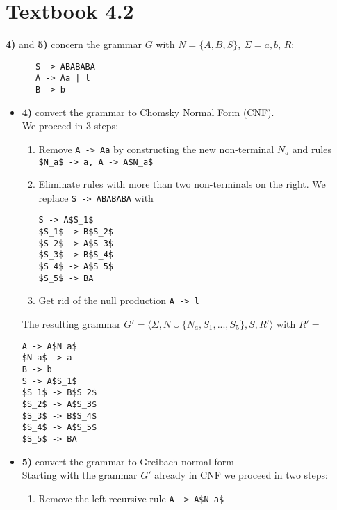 \documentclass[defaultpackages]{simplereport}
\begin{document}
  \section*{Textbook 4.2}
  \textbf{4)} and \textbf{5)} concern the grammar $G$ with $N = \{A, B, S\}$,
  $\Sigma = {a, b}$, $R:$
    \begin{lstlisting}
      S -> ABABABA
      A -> Aa | l
      B -> b
      \end{lstlisting}
  \begin{itemize}[label=]
  \item \textbf{4)} convert the grammar to Chomsky Normal Form (CNF).\\
    We proceed in 3 steps:
    \begin{enumerate}
      \item Remove \lstinline{A -> Aa} by constructing the new non-terminal
        $N_a$ and rules \lstinline{$N_a$ -> a, A -> A$N_a$}
      \item Eliminate rules with more than two non-terminals on the right. We
        replace \lstinline{S -> ABABABA} with
        \begin{lstlisting}
S -> A$S_1$
$S_1$ -> B$S_2$
$S_2$ -> A$S_3$
$S_3$ -> B$S_4$
$S_4$ -> A$S_5$
$S_5$ -> BA
        \end{lstlisting}
      \item Get rid of the null production \lstinline{A -> l}
      \end{enumerate}
      The resulting grammar $G' = \langle \Sigma, N \cup \{N_a, S_{1}, ... ,
      S_5\}, S, R' \rangle$ with $R' = $
      \begin{lstlisting}
A -> A$N_a$
$N_a$ -> a
B -> b
S -> A$S_1$
$S_1$ -> B$S_2$
$S_2$ -> A$S_3$
$S_3$ -> B$S_4$
$S_4$ -> A$S_5$
$S_5$ -> BA
\end{lstlisting}

    \item \textbf{5)} convert the grammar to Greibach normal form\\
      Starting with the grammar $G'$ already in CNF we proceed in two steps:
      \begin{enumerate}
        \item Remove the left recursive rule \lstinline{A -> A$N_a$}
      \end{enumerate}
  \end{itemize}
\end{document}
